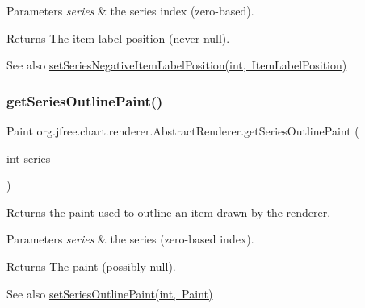 \begin{DoxyParams}{Parameters}
{\em series} & the series index (zero-\/based).\\
\hline
\end{DoxyParams}
\begin{DoxyReturn}{Returns}
The item label position (never {\ttfamily null}).
\end{DoxyReturn}
\begin{DoxySeeAlso}{See also}
\mbox{\hyperlink{classorg_1_1jfree_1_1chart_1_1renderer_1_1_abstract_renderer_a308ce803c5fb75f2804b6f54d24877f5}{set\+Series\+Negative\+Item\+Label\+Position(int, Item\+Label\+Position)}} 
\end{DoxySeeAlso}
\mbox{\label{classorg_1_1jfree_1_1chart_1_1renderer_1_1_abstract_renderer_a984ad77afa8a897e282eb6c8d91f0f25}} 
\subsubsection{\texorpdfstring{get\+Series\+Outline\+Paint()}{getSeriesOutlinePaint()}}
{\footnotesize\ttfamily Paint org.\+jfree.\+chart.\+renderer.\+Abstract\+Renderer.\+get\+Series\+Outline\+Paint (\begin{DoxyParamCaption}\item[{int}]{series }\end{DoxyParamCaption})}

Returns the paint used to outline an item drawn by the renderer.


\begin{DoxyParams}{Parameters}
{\em series} & the series (zero-\/based index).\\
\hline
\end{DoxyParams}
\begin{DoxyReturn}{Returns}
The paint (possibly {\ttfamily null}).
\end{DoxyReturn}
\begin{DoxySeeAlso}{See also}
\mbox{\hyperlink{classorg_1_1jfree_1_1chart_1_1renderer_1_1_abstract_renderer_a6d27857d69d54d10b75734d830f52488}{set\+Series\+Outline\+Paint(int, Paint)}} 
\end{DoxySeeAlso}
\mbox{\label{classorg_1_1jfree_1_1chart_1_1renderer_1_1_abstract_renderer_a0fde5e94f100a135e55fc7fc7f53478b}} 

